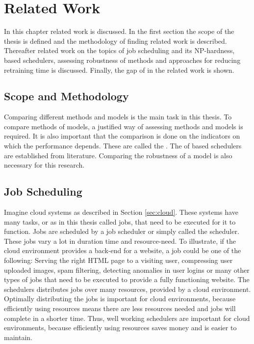 \chapter{Related Work}

In this chapter related work is discussed. In the first section the scope of
the thesis is defined and the methodology of finding related work is
described. Thereafter related work on the topics of job scheduling and its
NP-hardness, \rl based schedulers, assessing robustness of \rl methods and
approaches for reducing retraining time is discussed. Finally, the gap of in
the related work is shown.


\section{Scope and Methodology}

Comparing different methods and models is the main task in this thesis. To
compare methods of models, a justified way of assessing methods and models is
required. It is also important that the comparison is done on the indicators
on which the performance depends. These are called the \kpis. The \kpis of \rl
based schedulers are established from literature. Comparing the robustness of
a model is also necessary for this research.



\section{Job Scheduling}\label{sec:scheduling}

Imagine cloud systems as described in Section \ref{sec:cloud}. These systems
have many tasks, or as in this thesis called jobs, that need to be executed
for it to function. Jobs are scheduled by a job scheduler or simply called the
scheduler. These jobs vary a lot in duration time and resource-need. To
illustrate, if the cloud environment provides a back-end for a website, a job
could be one of the following: Serving the right HTML page to a visiting user,
compressing user uploaded images, spam filtering, detecting anomalies in user
logins or many other types of jobs that need to be executed to provide a fully
functioning website. The schedulers distributes jobs over many resources,
provided by a cloud environment. Optimally distributing the jobs is important
for cloud environments, because efficiently using resources means there are
less resources needed and jobs will complete in a shorter time. Thus, well
working schedulers are important for cloud environments, because efficiently
using resources saves money and is easier to maintain.

